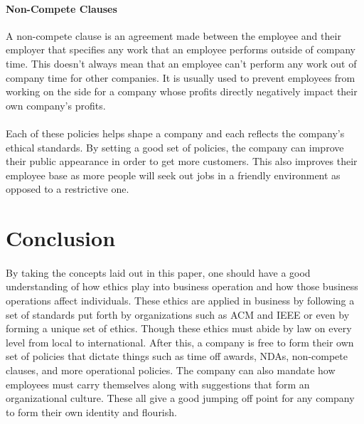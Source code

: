 \documentclass[notitlepage,a4paper,12pt]{article}
\begin{document}
\paragraph{Non-Compete Clauses}A non-compete clause is an agreement made between the employee and their employer that specifies any work that an employee performs outside of company time. This doesn't always mean that an employee can't perform any work out of company time for other companies. It is usually used to prevent employees from working on the side for a company whose profits directly negatively impact their own company's profits.
\paragraph{}Each of these policies helps shape a company and each reflects the company's ethical standards. By setting a good set of policies, the company can improve their public appearance in order to get more customers. This also improves their employee base as more people will seek out jobs in a friendly environment as opposed to a restrictive one.

\section*{Conclusion}
\paragraph{}By taking the concepts laid out in this paper, one should have a good understanding of how ethics play into business operation and how those business operations affect individuals. These ethics are applied in business by following a set of standards put forth by organizations such as ACM and IEEE or even by forming a unique set of ethics. Though these ethics must abide by law on every level from local to international. After this, a company is free to form their own set of policies that dictate things such as time off awards, NDAs, non-compete clauses, and more operational policies. The company can also mandate how employees must carry themselves along with suggestions that form an organizational culture. These all give a good jumping off point for any company to form their own identity and flourish.
\end{document}
